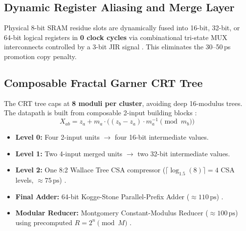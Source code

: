 \documentclass[10pt,journal,compsoc]{IEEEtran}
\begin{document}
\subsection{Dynamic Register Aliasing and Merge Layer}
Physical 8-bit SRAM residue slots are dynamically fused into 16-bit, 32-bit, or 64-bit logical registers in \textbf{0 clock cycles} via combinational tri-state MUX interconnects controlled by a 3-bit JIR signal \cite{arm_sve_ref, intel_sdm_avx512}. This eliminates the 30--50\,ps promotion copy penalty.

\subsection{Composable Fractal Garner CRT Tree}
The CRT tree caps at \textbf{8 moduli per cluster}, avoiding deep 16-modulus trees. The datapath is built from composable 2-input building blocks \cite{garner1959rns}:
\begin{equation}
X_{ab} = z_a + m_a \cdot \Big( (z_b - z_a) \cdot m_a^{-1} \pmod{m_b} \Big)
\end{equation}

\begin{itemize}
    \item \textbf{Level 0:} Four 2-input units $\to$ four 16-bit intermediate values.
    \item \textbf{Level 1:} Two 4-input merged units $\to$ two 32-bit intermediate values.
    \item \textbf{Level 2:} One 8:2 Wallace Tree CSA compressor ($\lceil \log_{1.5}(8) \rceil = 4$ CSA levels, $\approx 75\,\text{ps}$) \cite{wallace1964multiplier, amd_zen4_hotchips}.
    \item \textbf{Final Adder:} 64-bit Kogge-Stone Parallel-Prefix Adder ($\approx 110\,\text{ps}$) \cite{kogge1973parallel, apple_m2_hotchips}.
    \item \textbf{Modular Reducer:} Montgomery Constant-Modulus Reducer ($\approx 100\,\text{ps}$) using precomputed $R = 2^n \pmod M$ \cite{montgomery1985modular, intel_aes_ni}.
\end{itemize}
\end{document}

